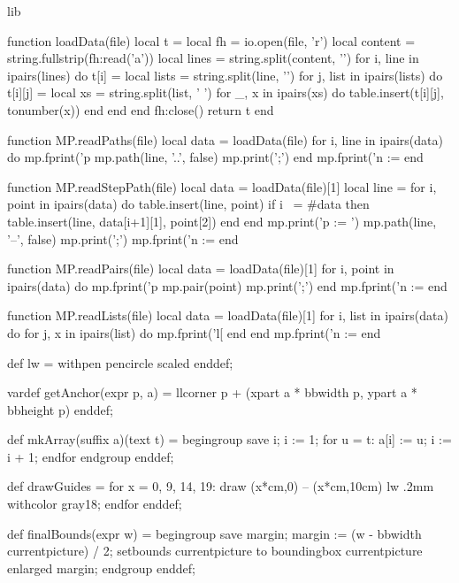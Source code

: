 \startenvironment lib

\startluacode

function loadData(file)
  local t = {}
  local fh = io.open(file, 'r')
  local content = string.fullstrip(fh:read('a'))
  local lines = string.split(content, '\n\n')
  for i, line in ipairs(lines) do
    t[i] = {}
    local lists = string.split(line, '\n')
    for j, list in ipairs(lists) do
      t[i][j] = {}
      local xs = string.split(list, ' ')
      for _, x in ipairs(xs) do
        table.insert(t[i][j], tonumber(x))
      end
    end
  end
  fh:close()
  return t
end

function MP.readPaths(file)
  local data = loadData(file)
  for i, line in ipairs(data) do
    mp.fprint('p%
    mp.path(line, '..', false)
    mp.print(';')
  end
  mp.fprint('n := %
end

function MP.readStepPath(file)
  local data = loadData(file)[1]
  local line = {}
  for i, point in ipairs(data) do
    table.insert(line, point)
    if i ~= #data then
      table.insert(line, {data[i+1][1], point[2]})
    end
  end
  mp.print('p := ')
  mp.path(line, '--', false)
  mp.print(';')
  mp.fprint('n := %
end

function MP.readPairs(file)
  local data = loadData(file)[1]
  for i, point in ipairs(data) do
    mp.fprint('p%
    mp.pair(point)
    mp.print(';')
  end
  mp.fprint('n := %
end

function MP.readLists(file)
  local data = loadData(file)[1]
  for i, list in ipairs(data) do
    for j, x in ipairs(list) do
      mp.fprint('l[%
    end
  end
  mp.fprint('n := %
end

\stopluacode

\startMPdefinitions

def lw = withpen pencircle scaled enddef;

vardef getAnchor(expr p, a) = llcorner p + (xpart a * bbwidth p, ypart a * bbheight p) enddef;

def mkArray(suffix a)(text t) = begingroup
  save i; i := 1;
  for u = t:
    a[i] := u;
    i := i + 1;
  endfor
endgroup enddef;

def drawGuides =
  for x = 0, 9, 14, 19:
    draw (x*cm,0) -- (x*cm,10cm) lw .2mm withcolor gray18;
  endfor
enddef;

def finalBounds(expr w) = begingroup
  save margin;
  margin := (w - bbwidth currentpicture) / 2;
  setbounds currentpicture to boundingbox currentpicture enlarged margin;
endgroup enddef;

